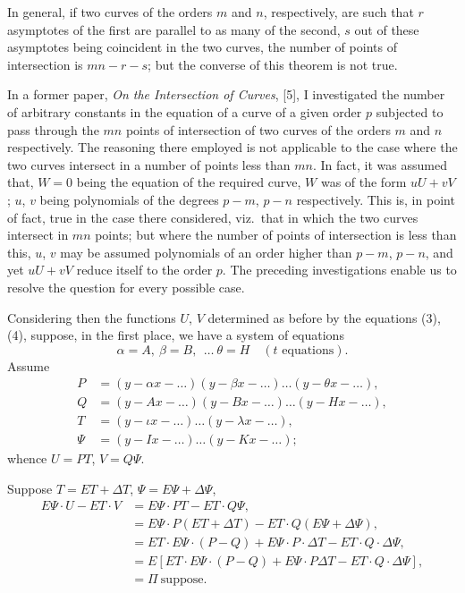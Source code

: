 \documentclass[11pt]{article}
\begin{document}
In general, if two curves of the orders $m$ and $n$, respectively, are such that $r$ asymptotes of the first are parallel to as many of the second, $s$ out of these asymptotes being coincident in the two curves, the number of points of intersection is $mn - r - s$; but the converse of this theorem is not true.

In a former paper, \textit{On the Intersection of Curves}, [5], I investigated the number of arbitrary constants in the equation of a curve of a given order $p$ subjected to pass through the $mn$ points of intersection of two curves of the orders $m$ and $n$ respectively. The reasoning there employed is not applicable to the case where the two curves intersect in a number of points less than $mn$. In fact, it was assumed that, $W = 0$ being the equation of the required curve, $W$ was of the form $u U + v V$; $u$, $v$ being polynomials of the degrees $p - m$, $p - n$ respectively. This is, in point of fact, true in the case there considered, viz.\ that in which the two curves intersect in $mn$ points; but where the number of points of intersection is less than this, $u$, $v$ may be assumed polynomials of an order higher than $p - m$, $p - n$, and yet $u U + v V$ reduce itself to the order $p$. The preceding investigations enable us to resolve the question for every possible case.

Considering then the functions $U$, $V$ determined as before by the equations (3), (4), suppose, in the first place, we have a system of equations
\[
\alpha = A,\ \beta = B,\ \ \ldots\ \theta = H\quad(t\text{ equations}) \tag{8}.
\]
Assume
\[
\begin{aligned}
P &= (y - \alpha x - \ldots)(y - \beta x - \ldots) \ldots (y - \theta x - \ldots), \\
Q &= (y - A x - \ldots)(y - B x - \ldots) \ldots (y - H x - \ldots), \\
T &= (y - \iota x - \ldots) \ldots (y - \lambda x - \ldots), \\
\Psi &= (y - I x - \ldots) \ldots (y - K x - \ldots);
\end{aligned}
\]
whence $U = P T$, $V = Q \Psi$.

Suppose $T = E T + \Delta T$, $\Psi = E \Psi + \Delta \Psi$,
\[
\begin{aligned}
E\Psi \cdot U - E T \cdot V &= E\Psi \cdot P T - E T \cdot Q\Psi, \\
&= E\Psi \cdot P (E T + \Delta T) - E T \cdot Q (E\Psi + \Delta\Psi), \\
&= E T \cdot E\Psi \cdot (P - Q) + E\Psi \cdot P \cdot \Delta T - E T \cdot Q \cdot \Delta\Psi, \\
&= E[E T \cdot E\Psi \cdot (P - Q) + E\Psi \cdot P \Delta T - E T \cdot Q \cdot \Delta\Psi], \\
&= \Pi\ \text{suppose}.
\end{aligned}
\]
\end{document}
